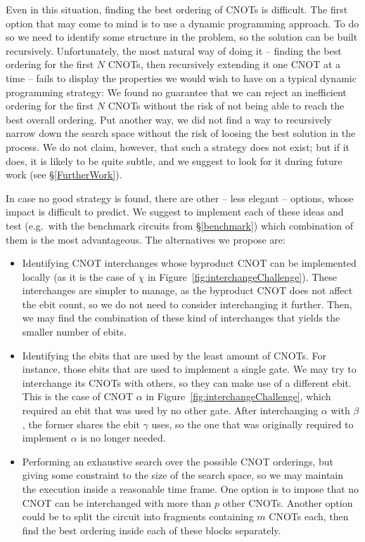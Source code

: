Even in this situation, finding the best ordering of CNOTs is difficult. The first option that may come to mind is to use a dynamic programming approach. To do so we need to identify some structure in the problem, so the solution can be built recursively. Unfortunately, the most natural way of doing it -- finding the best ordering for the first \(N\) CNOTs, then recursively extending it one CNOT at a time -- fails to display the properties we would wish to have on a typical dynamic programming strategy: We found no guarantee that we can reject an inefficient ordering for the first \(N\) CNOTs without the risk of not being able to reach the best overall ordering. Put another way, we did not find a way to recursively narrow down the search space without the risk of loosing the best solution in the process. We do not claim, however, that such a strategy does not exist; but if it does, it is likely to be quite subtle, and we suggest to look for it during future work (see \S\ref{FurtherWork}).

In case no good strategy is found, there are other -- less elegant -- options, whose impact is difficult to predict. We suggest to implement each of these ideas and test (e.g.\ with the benchmark circuits from \S\ref{benchmark}) which combination of them is the most advantageous. The alternatives we propose are:

\begin{itemize}

\item Identifying CNOT interchanges whose byproduct CNOT can be implemented locally (as it is the case of \(\chi\) in Figure~\ref{fig:interchangeChallenge}). These interchanges are simpler to manage, as the byproduct CNOT does not affect the ebit count, so we do not need to consider interchanging it further. Then, we may find the combination of these kind of interchanges that yields the smaller number of ebits.

\item Identifying the ebits that are used by the least amount of CNOTs. For instance, those ebits that are used to implement a single gate. We may try to interchange its CNOTs with others, so they can make use of a different ebit. This is the case of CNOT \(\alpha\) in Figure~\ref{fig:interchangeChallenge}, which required an ebit that was used by no other gate. After interchanging \(\alpha\) with \(\beta\), the former shares the ebit \(\gamma\) uses, so the one that was originally required to implement \(\alpha\) is no longer needed.

\item Performing an exhaustive search over the possible CNOT orderings, but giving some constraint to the size of the search space, so we may maintain the execution inside a reasonable time frame. One option is to impose that no CNOT can be interchanged with more than \(p\) other CNOTs. Another option could be to split the circuit into fragments containing \(m\) CNOTs each, then find the best ordering inside each of these blocks separately.

\end{itemize}
